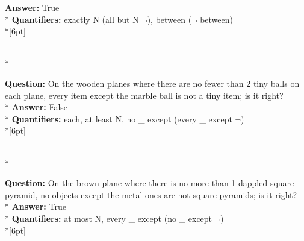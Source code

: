 \begin{figure*}
\begin{minipage}{0.48\textwidth}
\begin{minipage}[t][2.2cm][t]{1\textwidth}
      \textbf{Answer:} True \\*
      \textbf{Quantifiers:} exactly N (all but N $\neg$), between ($\neg$ between) \\*[6pt]
    \end{minipage}\\*
    \begin{minipage}[t][2.2cm][t]{1\textwidth}
      \footnotesize
      \textbf{Question:} On the wooden planes where there are no fewer than 2 tiny balls on each plane, every item except the marble ball is not a tiny item; is it right? \\*
      \textbf{Answer:} False \\*
      \textbf{Quantifiers:} each, at least N, no \_ except (every \_ except $\neg$) \\*[6pt]
    \end{minipage}\\*
    \begin{minipage}[t][2.2cm][t]{1\textwidth}
      \footnotesize
      \textbf{Question:} On the brown plane where there is no more than 1 dappled square pyramid, no objects except the metal ones are not square pyramids; is it right? \\*
      \textbf{Answer:} True \\*
      \textbf{Quantifiers:} at most N, every \_ except (no \_ except $\neg$) \\*[6pt]
    \end{minipage}
  \end{minipage}
\end{figure*}